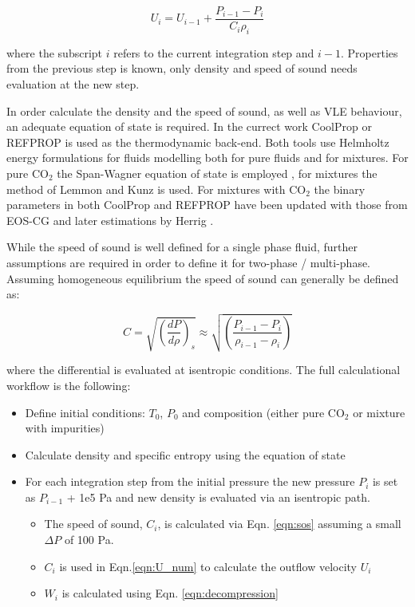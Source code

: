 \documentclass[a4paper, 10pt, twocolumn, twoside]{scrartcl}
\begin{document}
\begin{equation}\label{eqn:U_num}
U_i = U_{i-1} + \frac{P_{i-1}-P_i}{C_i \rho_i}
\end{equation}

where the subscript $i$ refers to the current integration step and $i-1$. Properties from the previous step is known, only density and speed of sound needs evaluation at the new step. 

In order calculate the density and the speed of sound, as well as VLE behaviour,  an adequate equation of state is required. In the currect work CoolProp \cite{coolprop} or REFPROP \cite{REFPROP} is used as the thermodynamic back-end. Both tools use Helmholtz energy formulations for fluids modelling both for pure fluids and for mixtures. For pure CO$_2$ the Span-Wagner equation of state is employed \cite{Span2009}, for mixtures the method of Lemmon \cite{Lemmon1999} and Kunz \cite{Kunz2012} is used. For mixtures with CO$_2$ the binary parameters in both CoolProp and REFPROP have been updated with those from EOS-CG \cite{Gernert2016} and later estimations by Herrig \cite{Herrig2018}. 

While the speed of sound is well defined for a single phase fluid, further assumptions are required in order to define it for two-phase / multi-phase. Assuming homogeneous equilibrium the speed of sound can generally be defined as:

\begin{equation}\label{eqn:sos}
C = \sqrt{\left( \frac{dP}{d\rho}\right)_s} \approx \sqrt{\left( \frac{P_{i-1} - P_i}{\rho_{i-1}-\rho_i}\right)}
\end{equation}

where the differential is evaluated at isentropic conditions. The full calculational workflow is the following:

\begin{itemize}
	\item Define initial conditions: $T_0$, $P_0$ and composition (either pure CO$_2$ or mixture with impurities)
	\item Calculate density and specific entropy using the equation of state
	\item For each integration step from the initial pressure the new pressure $P_i$ is set as $P_{i-1}$ + 1e5 Pa and new density is evaluated via an isentropic path.
	\begin{itemize}
		\item The speed of sound, $C_i$, is calculated via Eqn. \ref{eqn:sos} assuming a small $\Delta P$ of 100 Pa. 
		\item $C_i$ is used in Eqn.\ref{eqn:U_num} to calculate the outflow velocity $U_i$
		\item $W_i$ is calculated using Eqn. \ref{eqn:decompression}
	\end{itemize}
\end{itemize}
\end{document}
